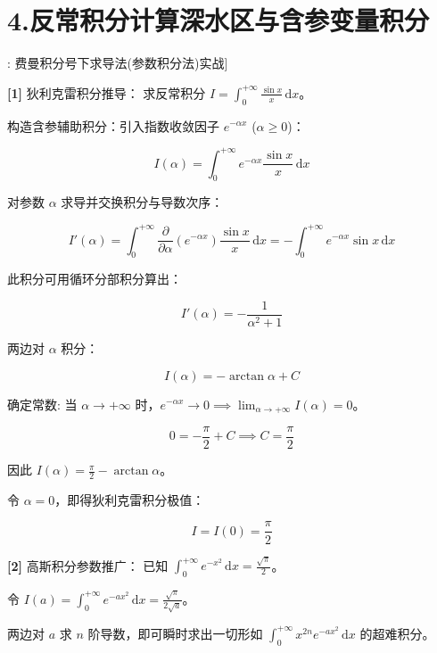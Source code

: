 \documentclass[11pt,a4paper,UTF8]{ctexart}
\begin{document}
\section{4.反常积分计算深水区与含参变量积分}

\begin{thmbox}[模型[1]: 费曼积分号下求导法(参数积分法)实战]

\textbf{[1]} 狄利克雷积分推导：
求反常积分 $I = \int_0^{+\infty} \frac{\sin x}{x}\,\mathrm{d}x$。

构造含参辅助积分：引入指数收敛因子 $e^{-\alpha x}$ ($\alpha \geqslant 0$)：


\begin{equation*}
I(\alpha) = \int_0^{+\infty} e^{-\alpha x}\frac{\sin x}{x}\,\mathrm{d}x
\end{equation*}


对参数 $\alpha$ 求导并交换积分与导数次序：


\begin{equation*}
I'(\alpha) = \int_0^{+\infty} \frac{\partial}{\partial \alpha}\left(e^{-\alpha x}\right)\frac{\sin x}{x}\,\mathrm{d}x = -\int_0^{+\infty} e^{-\alpha x}\sin x\,\mathrm{d}x
\end{equation*}


此积分可用循环分部积分算出：


\begin{equation*}
I'(\alpha) = -\frac{1}{\alpha^2 + 1}
\end{equation*}


两边对 $\alpha$ 积分：


\begin{equation*}
I(\alpha) = -\arctan \alpha + C
\end{equation*}


确定常数: 当 $\alpha \to +\infty$ 时，$e^{-\alpha x} \to 0 \implies \lim_{\alpha \to +\infty} I(\alpha) = 0$。


\begin{equation*}
0 = -\frac{\pi}{2} + C \implies C = \frac{\pi}{2}
\end{equation*}


因此 $I(\alpha) = \frac{\pi}{2} - \arctan \alpha$。

令 $\alpha = 0$，即得狄利克雷积分极值：


\begin{equation*}
I = I(0) = \frac{\pi}{2}
\end{equation*}


\textbf{[2]} 高斯积分参数推广：
已知 $\int_0^{+\infty} e^{-x^2}\,\mathrm{d}x = \frac{\sqrt{\pi}}{2}$。

令 $I(a) = \int_0^{+\infty} e^{-a x^2}\,\mathrm{d}x = \frac{\sqrt{\pi}}{2\sqrt{a}}$。

两边对 $a$ 求 $n$ 阶导数，即可瞬时求出一切形如 $\int_0^{+\infty} x^{2n} e^{-a x^2}\,\mathrm{d}x$ 的超难积分。

\end{thmbox}
\end{document}
